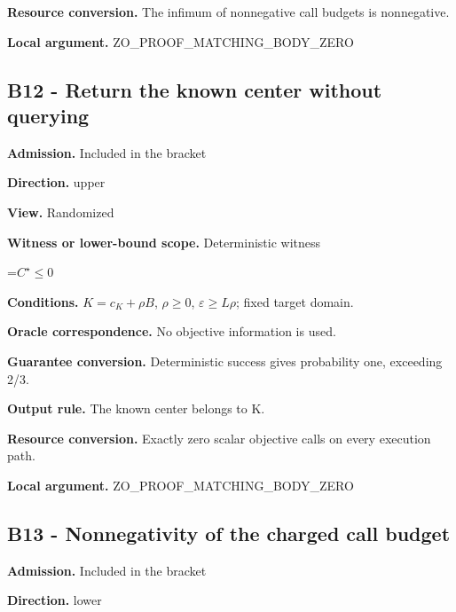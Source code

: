 \documentclass[10pt,a4paper]{article}
\newcommand{\AtlasMath}[1]{\par\begingroup\centering\setbox0=\hbox{$\displaystyle #1$}\ifdim\wd0>1.4\linewidth\typeout{ATLAS WIDE FORMULA: \the\wd0}\fi\ifdim\wd0>\linewidth\resizebox{\linewidth}{!}{\box0}\else\box0\fi\par\endgroup}
\begin{document}
\textbf{Resource conversion.} The infimum of nonnegative call budgets is nonnegative.



\textbf{Local argument.} ZO\_PROOF\_MATCHING\_BODY\_ZERO



\subsection{B12 - Return the known center without querying}


\textbf{Admission.} Included in the bracket



\textbf{Direction.} upper



\textbf{View.} Randomized



\textbf{Witness or lower-bound scope.} Deterministic witness



\AtlasMath{C^\star\le0}


\textbf{Conditions.} $K=c_K+\rho B$, $\rho \ge 0$, $\varepsilon \ge L\rho$; fixed target domain.



\textbf{Oracle correspondence.} No objective information is used.



\textbf{Guarantee conversion.} Deterministic success gives probability one, exceeding 2/3.



\textbf{Output rule.} The known center belongs to K.



\textbf{Resource conversion.} Exactly zero scalar objective calls on every execution path.



\textbf{Local argument.} ZO\_PROOF\_MATCHING\_BODY\_ZERO



\subsection{B13 - Nonnegativity of the charged call budget}


\textbf{Admission.} Included in the bracket



\textbf{Direction.} lower
\end{document}
